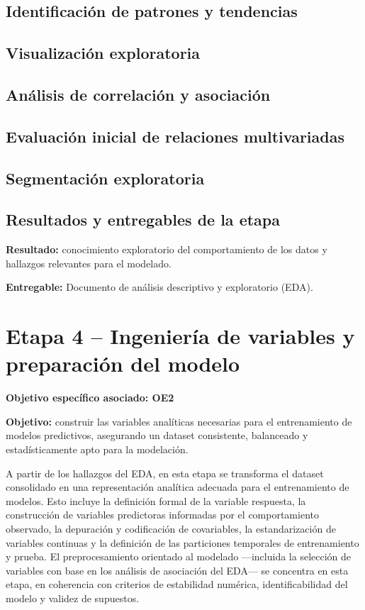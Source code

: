\subsection{Identificación de patrones y tendencias}

\subsection{Visualización exploratoria}

\subsection{Análisis de correlación y asociación}

\subsection{Evaluación inicial de relaciones multivariadas}

\subsection{Segmentación exploratoria}

\subsection{Resultados y entregables de la etapa}


\textbf{Resultado:} conocimiento exploratorio del comportamiento de los datos y hallazgos relevantes para el modelado.

\textbf{Entregable:} Documento de análisis descriptivo y exploratorio (EDA).


\section{Etapa 4 – Ingeniería de variables y preparación del modelo}

\textbf{Objetivo específico asociado: OE2}

\textbf{Objetivo:} construir las variables analíticas necesarias para el entrenamiento de modelos predictivos, asegurando un dataset consistente, balanceado y estadísticamente apto para la modelación.

A partir de los hallazgos del EDA, en esta etapa se transforma el dataset consolidado en una representación analítica adecuada para el entrenamiento de modelos. Esto incluye la definición formal de la variable respuesta, la construcción de variables predictoras informadas por el comportamiento observado, la depuración y codificación de covariables, la estandarización de variables continuas y la definición de las particiones temporales de entrenamiento y prueba. El preprocesamiento orientado al modelado ---incluida la selección de variables con base en los análisis de asociación del EDA--- se concentra en esta etapa, en coherencia con criterios de estabilidad numérica, identificabilidad del modelo y validez de supuestos.

